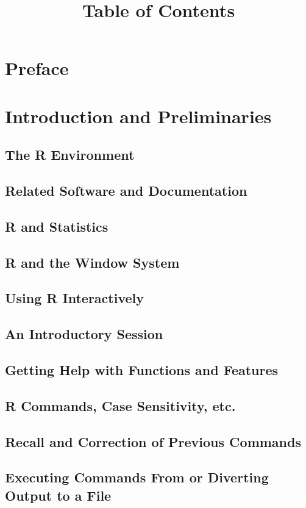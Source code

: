 \documentclass{article}
\title{Table of Contents}
\author{}
\date{}
\begin{document}
\maketitle

\tableofcontents

\section*{Preface}

\section{Introduction and Preliminaries}
\subsection{The R Environment}
\subsection{Related Software and Documentation}
\subsection{R and Statistics}
\subsection{R and the Window System}
\subsection{Using R Interactively}
\subsection{An Introductory Session}
\subsection{Getting Help with Functions and Features}
\subsection{R Commands, Case Sensitivity, etc.}
\subsection{Recall and Correction of Previous Commands}
\subsection{Executing Commands From or Diverting Output to a File}
\end{document}
